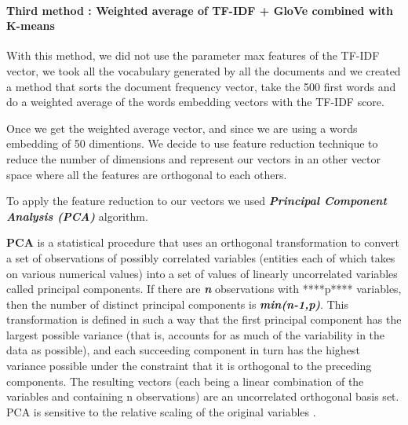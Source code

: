 \documentclass[journal,twocolumn]{IEEEtran}
\begin{document}
    \begin{figure}
        \begin{center}\end{center}
        \caption{}
        \label{}
    \end{figure}
    
    \paragraph{Third method : Weighted average of TF-IDF + GloVe combined
with
K-means}\label{third-method-weighted-average-of-tf-idf-glove-combined-with-k-means}

With this method, we did not use the parameter max features of the
TF-IDF vector, we took all the vocabulary generated by all the documents
and we created a method that sorts the document frequency vector, take
the 500 first words and do a weighted average of the words embedding
vectors with the TF-IDF score.

Once we get the weighted average vector, and since we are using a words
embedding of 50 dimentions. We decide to use feature reduction technique
to reduce the number of dimensions and represent our vectors in an other
vector space where all the features are orthogonal to each others.

To apply the feature reduction to our vectors we used
\textbf{\emph{Principal Component Analysis (PCA)}} algorithm.

\textbf{PCA} is a statistical procedure that uses an orthogonal
transformation to convert a set of observations of possibly correlated
variables (entities each of which takes on various numerical values)
into a set of values of linearly uncorrelated variables called principal
components. If there are \textbf{\emph{n}} observations with ****p****
variables, then the number of distinct principal components is
\textbf{\emph{min(n-1,p)}}. This transformation is defined in such a way
that the first principal component has the largest possible variance
(that is, accounts for as much of the variability in the data as
possible), and each succeeding component in turn has the highest
variance possible under the constraint that it is orthogonal to the
preceding components. The resulting vectors (each being a linear
combination of the variables and containing n observations) are an
uncorrelated orthogonal basis set. PCA is sensitive to the relative
scaling of the original variables \cite{PCA}.
\end{document}
